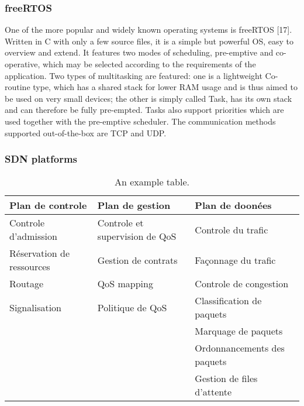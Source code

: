 \subsubsection{freeRTOS}

One of the more popular and widely known operating systems is freeRTOS [17].
Written in C with only a few source files,
	it is a simple but powerful OS,
	easy to overview and extend.
It features two modes of scheduling,
	pre-emptive and co-operative,
	which may be selected according to the requirements of the application.
Two types of multitasking are featured:
	one is a lightweight Co-routine type,
	which has a shared stack for lower RAM usage and is thus aimed to be used on very small devices;
	the other is simply called Task,
	has its own stack and can therefore be fully pre-empted.
Tasks also support priorities which are used together with the pre-emptive scheduler.
The communication methods supported out-of-the-box are TCP and UDP.

\subsubsection{SDN platforms}

\begin{table}[h]
\scriptsize
	\begin{tabulary}{\textwidth}{L|L|L}
	\textbf{Plan de controle} & \textbf{Plan de gestion}       & \textbf{Plan de doonées}   \\\hline
	Controle d'admission      & Controle et supervision de QoS & Controle du trafic         \\
	Réservation de ressources & Gestion de contrats            & Façonnage du trafic        \\
	Routage                   & QoS mapping                    & Controle de congestion     \\
	Signalisation             & Politique de QoS               & Classification de paquets  \\
	\                         &                                & Marquage de paquets        \\
	\                         &                                & Ordonnancements des paquets\\
	\                         &                                & Gestion de files d'attente \\
	\end{tabulary}
	\caption{\label{tab:qos} An example table.}
\end{table}


